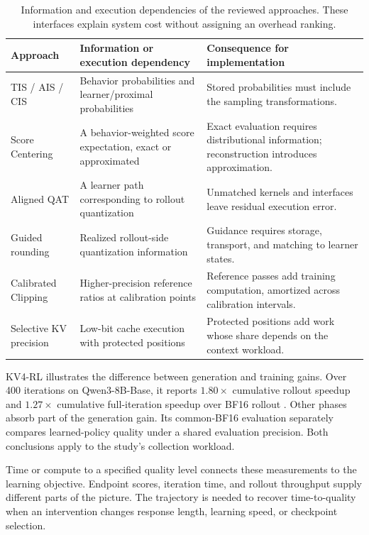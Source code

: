 \begin{table}[!htbp]
\centering\small
\caption{Information and execution dependencies of the reviewed approaches. These interfaces explain system cost without assigning an overhead ranking.}\label{tab:interfaces}
\begin{tabularx}{\linewidth}{@{}P{32mm}YY@{}}\toprule
{} \textbf{Approach} & \textbf{Information or execution dependency} & \textbf{Consequence for implementation}\\\midrule
TIS / AIS / CIS & Behavior probabilities and learner/proximal probabilities & Stored probabilities must include the sampling transformations.\\
Score Centering & A behavior-weighted score expectation, exact or approximated & Exact evaluation requires distributional information; reconstruction introduces approximation.\\
Aligned QAT & A learner path corresponding to rollout quantization & Unmatched kernels and interfaces leave residual execution error.\\
Guided rounding & Realized rollout-side quantization information & Guidance requires storage, transport, and matching to learner states.\\
Calibrated Clipping \citep{fullfp8} & Higher-precision reference ratios at calibration points & Reference passes add training computation, amortized across calibration intervals.\\
Selective KV precision & Low-bit cache execution with protected positions & Protected positions add work whose share depends on the context workload.\\\bottomrule
\end{tabularx}
\end{table}

KV4-RL illustrates the difference between generation and training gains. Over 400 iterations on Qwen3-8B-Base, it reports $1.80\times$ cumulative rollout speedup and $1.27\times$ cumulative full-iteration speedup over BF16 rollout \citep{kv4}. Other phases absorb part of the generation gain. Its common-BF16 evaluation separately compares learned-policy quality under a shared evaluation precision. Both conclusions apply to the study's collection workload.

Time or compute to a specified quality level connects these measurements to the learning objective. Endpoint scores, iteration time, and rollout throughput supply different parts of the picture. The trajectory is needed to recover time-to-quality when an intervention changes response length, learning speed, or checkpoint selection.

